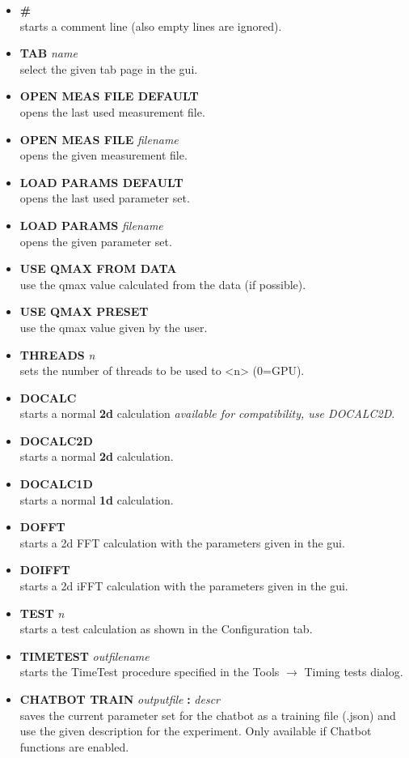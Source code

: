 \documentclass[11pt]{article} %
\begin{document}
\begin{itemize}\itemsep0pt
\item {\bf \#} \\
	starts a comment line (also empty lines are ignored).
\item {\bf TAB} {\it name} \\
	select the given tab page in the gui.
\item {\bf OPEN MEAS FILE DEFAULT} \\
	opens the last used measurement file.
\item {\bf OPEN MEAS FILE} {\it filename} \\
	opens the given measurement file.
\item {\bf LOAD PARAMS DEFAULT} \\
	opens the last used parameter set.
\item {\bf LOAD PARAMS} {\it filename} \\
	opens the given parameter set.
\item {\bf USE QMAX FROM DATA} \\
	use the qmax value calculated from the data (if possible).
\item {\bf USE QMAX PRESET} \\
	use the qmax value given by the user.
\item {\bf THREADS} {\it n} \\
	sets the number of threads to be used to <n> (0=GPU).
\item {\bf DOCALC} \\
	starts a normal {\bf 2d} calculation {\it available for compatibility, use DOCALC2D}.
\item {\bf DOCALC2D} \\
	starts a normal {\bf 2d} calculation.
\item {\bf DOCALC1D} \\
	starts a normal {\bf 1d} calculation.
\item {\bf DOFFT} \\
	starts a 2d FFT calculation with the parameters given in the gui.
\item {\bf DOIFFT} \\
	starts a 2d iFFT calculation with the parameters given in the gui.
\item {\bf TEST} {\it n} \\
	starts a test calculation as shown in the Configuration tab.
\item {\bf TIMETEST} {\it outfilename} \\
	starts the TimeTest procedure specified in the Tools $\rightarrow$ Timing tests dialog.
\item {\bf CHATBOT TRAIN} {\it outputfile} {\bf :} {\it descr} \\
	saves the current parameter set for the chatbot as a training file (.json) and use the given description for the experiment. Only available if Chatbot functions are enabled.
\end{itemize}
\end{document}
